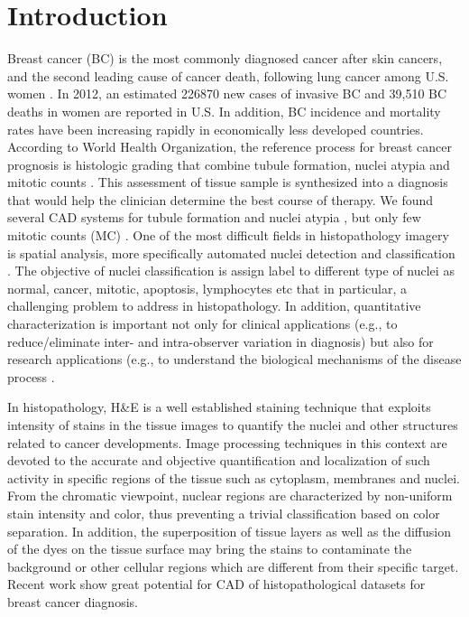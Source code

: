 \documentclass[10pt,twocolumn,letterpaper]{article}
\begin{document}
\section{Introduction}
Breast cancer (BC) is the most commonly diagnosed cancer after skin cancers, and the second leading cause of cancer death, following lung cancer among U.S. women \cite{jiemin2013}. In 2012, an estimated 226870 new cases of invasive BC and 39,510 BC deaths in women are reported in U.S. In addition, BC incidence and mortality rates have been increasing rapidly in economically less developed countries. According to World Health Organization, the reference process for breast cancer prognosis is histologic grading that combine tubule formation, nuclei atypia and mitotic counts \cite{bloom1957, elston1993}. This assessment of tissue sample is synthesized into a diagnosis that would help the clinician determine the best course of therapy. We found several CAD systems for tubule formation \cite{petushi2006, naik2008} and nuclei atypia \cite{cosatto2008, dalle2009, chaudhury2011, dundar2011}, but only few mitotic counts (MC) \cite{irshad2013a, irshad2013b}. One of the most difficult fields in histopathology imagery is spatial analysis, more specifically automated nuclei detection and classification \cite{fuchs2011}. The objective of nuclei classification is assign label to different type of nuclei as normal, cancer, mitotic, apoptosis, lymphocytes etc that in particular, a challenging problem to address in histopathology. In addition, quantitative characterization is important not only for clinical applications (e.g., to reduce/eliminate inter- and intra-observer variation in diagnosis) but also for research applications (e.g., to understand the biological mechanisms of the disease process \cite{gurcan2009}.
 
In histopathology, H\&E is a well established staining technique that exploits intensity of stains in the tissue images to quantify the nuclei and other structures related to cancer developments. Image processing techniques in this context are devoted to the accurate and objective quantification and localization of such activity in specific regions of the tissue such as cytoplasm, membranes and nuclei. From the chromatic viewpoint, nuclear regions are characterized by non-uniform stain intensity and color, thus preventing a trivial classification based on color separation. In addition, the superposition of tissue layers as well as the diffusion of the dyes on the tissue surface may bring the stains to contaminate the background or other cellular regions which are different from their specific target. Recent work \cite{khan2012b, irshad2013a, irshad2013b} show great potential for CAD of histopathological datasets for breast cancer diagnosis.
\end{document}
